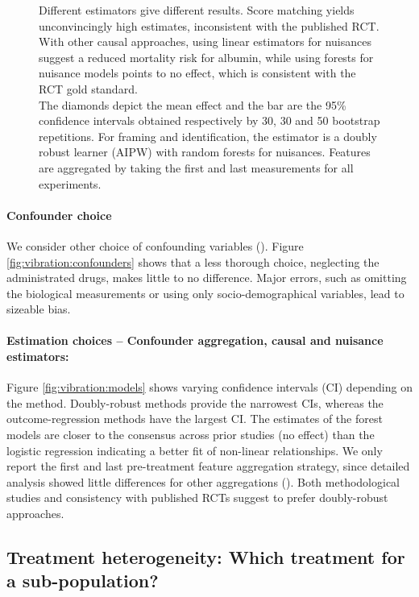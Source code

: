 \documentclass[10pt,letterpaper]{article}
\begin{document}
\begin{figure}[h!]
{    Different estimators give different results. Score matching yields
    unconvincingly high estimates, inconsistent with the published RCT. With
    other causal approaches, using linear estimators for nuisances suggest a
    reduced mortality risk for albumin, while using forests for nuisance models
    points to no effect, which is consistent with the RCT gold standard.
    \\The diamonds depict the mean effect and the bar are the 95\% confidence
    intervals obtained respectively by 30, 30 and 50 bootstrap repetitions. For
    framing and identification, the estimator is a doubly robust learner (AIPW)
    with random forests for nuisances. Features are aggregated by taking the
    first and last measurements for all experiments.}\label{fig:vibration_analysis}
\end{figure}


\paragraph{Confounder choice} We consider other choice of confounding variables
(). Figure
\ref{fig:vibration:confounders} shows that a less thorough choice, neglecting the
administrated drugs, makes little to no difference. Major errors, such as
omitting the biological measurements or using only socio-demographical
variables, lead to sizeable bias.

\paragraph{Estimation choices -- Confounder aggregation, causal and nuisance estimators:}

Figure \ref{fig:vibration:models} shows varying confidence intervals (CI)
depending on the method. Doubly-robust methods provide the narrowest CIs,
whereas the outcome-regression methods have the largest CI. The estimates of the
forest models are closer to the consensus across prior studies (no effect) than
the logistic regression indicating a better fit of non-linear relationships. We
only report the first and last pre-treatment feature aggregation strategy, since
detailed analysis showed little differences for other aggregations (). Both methodological studies \cite{naimi2023challenges} and
consistency with published RCTs suggest to prefer doubly-robust approaches.

\subsection*{Treatment heterogeneity: Which treatment for a sub-population?}%
\label{sec:treamtent_heterogeneity_mimic_iv}
\end{document}
